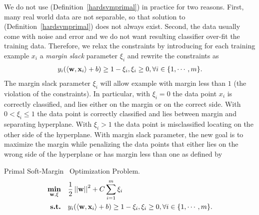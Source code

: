 {%
We do not use (Definition~\ref{hardsvmprimal}) in practice for two reasons. 
First, many real world data are not separable, so that solution to (Definition~\ref{hardsvmprimal}) does not always exist.
Second, the data usually come with noise and error and we do not want resulting classifier over-fit the training data.
Therefore, we relax the constraints by introducing for each training example $x_i$ a \textit{margin slack} parameter $\xi_i$ and rewrite the constraints as 
\begin{align}
	y_i(\langle \mathbf {w}, \mathbf {x}_i \rangle + b) \ge 1-\xi_i, \xi_i\ge 0, \forall i\in\{1,\cdots,m\}. \label{softsvmconstraint}
\end{align}
The margin slack parameter $\xi_i$ will allow example with margin less than $1$ (the violation of the constraints).
In particular, with $\xi_i=0$ the data point $x_i$ is correctly classified, and lies either on the margin or on the correct side.
With $0<\xi_i\le 1$ the data point is correctly classified and lies between margin and separating hyperplane.
With $\xi_i>1$ the data point is misclassified locating on the other side of the hyperplane.
With margin slack parameter, the new goal is to maximize the margin while penalizing the data points that either lies on the wrong side of the hyperplane or has margin less than one as defined by
\begin{definition}{Primal Soft-Margin \svm\ Optimization Problem.}\label{softsvmprimal}
	\begin{align*}
		\underset{\mathbf {w},\xi}{\textbf{min}} & \quad\frac{1}{2}\left|\left| \mathbf {w} \right|\right|^2 + C\sum_{i=1}^{m}\xi_i\\
		\textbf{s.t.} & \quad y_i(\langle \mathbf {w}, \mathbf {x}_i \rangle + b) \ge 1-\xi_i, \xi_i\ge 0, \forall i\in\{1,\cdots,m\}.
	\end{align*}
\end{definition}

}
